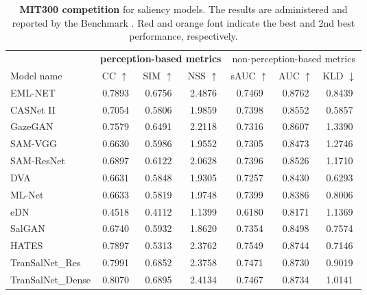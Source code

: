 \documentclass{article}
\begin{document}
\begin{table}[]
\caption{\textbf{MIT300 competition} for saliency models. The results are administered and reported by the Benchmark \cite{benchmark}. {\color{red}Red} and {\color{orange}orange} font indicate the best and 2nd best performance, respectively.}\label{tb:perf_comp_mit300}
\centering
\renewcommand{\arraystretch}{1.2}
\begin{adjustbox}{width=0.48\textwidth}
\begin{tabular}{l|c c c c c c }
\toprule

& \multicolumn{3}{c|}{\textbf{perception-based metrics}}              
& \multicolumn{3}{c}{non-perception-based metrics} \\
Model name & CC $\uparrow$ & SIM $\uparrow$ & \multicolumn{1}{c|}{NSS $\uparrow$} & sAUC $\uparrow$ &  AUC $\uparrow$ &  KLD $\downarrow$ \\ \midrule \midrule 

EML-NET~\cite{EML-NET}& 0.7893 & 0.6756 & \multicolumn{1}{c|}{{\color{red}2.4876}} & 0.7469 & {\color{red}0.8762} & 0.8439 \\
CASNet II~\cite{CASNET2}& 0.7054 &0.5806 & \multicolumn{1}{c|}{1.9859}& 0.7398 & 0.8552 &{\color{red}0.5857} \\
GazeGAN~\cite{GAZEGAN}& 0.7579 & 0.6491 & \multicolumn{1}{c|}{2.2118} & 0.7316 & 0.8607 &1.3390\\
SAM-VGG~\cite{SAM_Cornia}& 0.6630 & 0.5986 &\multicolumn{1}{c|}{1.9552}  &0.7305 &0.8473 &1.2746  \\
SAM-ResNet~\cite{SAM_Cornia}& 0.6897  &0.6122 & \multicolumn{1}{c|}{2.0628}  & 0.7396 & 0.8526 & 1.1710 \\
DVA~\cite{DVA_Wang}& 0.6631 & 0.5848& \multicolumn{1}{c|}{1.9305}& 0.7257 &0.8430 & {\color{orange}0.6293}\\
ML-Net~\cite{ML-Net}&0.6633 & 0.5819 &\multicolumn{1}{c|}{1.9748} & 0.7399 & 0.8386 & 0.8006 \\
eDN~\cite{eDN}&0.4518 &0.4112 &\multicolumn{1}{c|}{1.1399} & 0.6180 &0.8171 & 1.1369 \\
SalGAN~\cite{SalGAN}&0.6740 & 0.5932 &\multicolumn{1}{c|}{1.8620} & 0.7354 & 0.8498 &0.7574\\
HATES&0.7897 & 0.5313 &\multicolumn{1}{c|}{2.3762} & {\color{red}0.7549} & {\color{orange}0.8744} &0.7146\\
\midrule
TranSalNet\_Res & {\color{orange}0.7991} & {\color{orange}0.6852} & \multicolumn{1}{c|}{2.3758} & {\color{orange}0.7471} &0.8730 & 0.9019 \\
TranSalNet\_Dense & {\color{red}0.8070} & {\color{red}0.6895} & \multicolumn{1}{c|}{{\color{orange}2.4134}} & 0.7467 &0.8734 & 1.0141 \\
\bottomrule
\end{tabular}
\end{adjustbox}
\end{table}
\end{document}
